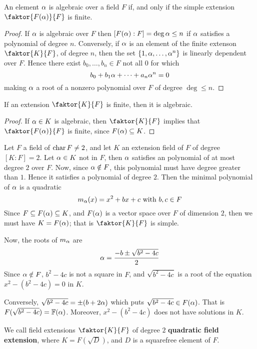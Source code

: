  \begin{lemma}\label{1.2.3}
     An element $\alpha$ is algebraic over a field  $F$ if, and only if the simple
     extension  $\faktor{F(\a)}{F}$ is finite.
 \end{lemma}
 \begin{proof}
     If $\alpha$ is algebraic over $F$ then  $[F(\alpha):F]=\deg{\alpha} \leq n$ if $\alpha$
     satisfies a polynomial of degree  $n$. Conversely, if  $\alpha$ is an element
     of the finite extenson  $\faktor{K}{F}$, of degree $n$, then the set
     $\{1,\alpha, \dots, \alpha^n\}$ is linearly dependent over $F$. Hence there exist
     $b_0, \dots, b_n \in F$ not all $0$ for which
     \begin{equation*}
         b_0+b_1\alpha+\dots+a_n\alpha^n=0
     \end{equation*}
     making $\alpha$ a root of a nonzero polynomial over $F$ of degree $\deg \leq n$.
 \end{proof}
 \begin{corollary}
     If an extension $\faktor{K}{F}$ is finite, then it is algebraic.
 \end{corollary}
 \begin{proof}
     If $\alpha \in K$ is algebraic, then  $\faktor{K}{F}$ implies that
     $\faktor{F(\a)}{F}$ is finite, since $F(\alpha) \subseteq K$.
 \end{proof}

 \begin{example}\label{example_1.6}
     Let $F$ a field of  $\operatorname{char}{F} \neq 2$, and let $K$ an extension field of
     $F$ of degree $[K:F]=2$. Let $\alpha \in K$  not in $F$, then  $\alpha$ satisfies
     an polynomial of at most degree  $2$ over $F$. Now, since  $\alpha \notin F$,
     this polynomial must have degree greater than $1$. Hence it satisfies a
     polynomial of degree $2$. Then the minimal polynomial of  $\alpha$ is a
     quadratic
     \begin{equation*}
         m_\alpha(x)=x^2+bx+c \text{ with } b,c \in F
     \end{equation*}
     Since $F \subseteq F(\alpha) \subseteq K$, and $F(\alpha)$ is a vector space over
     $F$ of dimension  $2$, then we must have  $K=F(\alpha)$; that is
     $\faktor{K}{F}$ is simple.

     Now, the roots of $m_\alpha$ are
     \begin{equation*}
         \alpha=\frac{-b \pm \sqrt{b^2-4c}}{2}
     \end{equation*}
     Since $\alpha \notin F$,  $b^2-4c$ is not a square in $F$, and
     $\sqrt{b^2-4c}$ is a root of the equation $x^2-(b^2-4c)=0$ in $K$.

     Conversely,  $\sqrt{b^2-4c}=\pm (b+2\alpha)$ which puts $\sqrt{b^2-4c} \in
     F(\alpha)$. That is $F(\sqrt{b^2-4c})=\mathbb{F}(\alpha)$. Moreover, $x^2-(b^2-4c)$ does
     not have solutions in $K$.

     We call field extensions  $\faktor{K}{F}$ of degree $2$ \textbf{quadratic
     field extension}, where $K=F(\sqrt{D})$, and $D$ is a squarefree element of
     $F$.
 \end{example}

